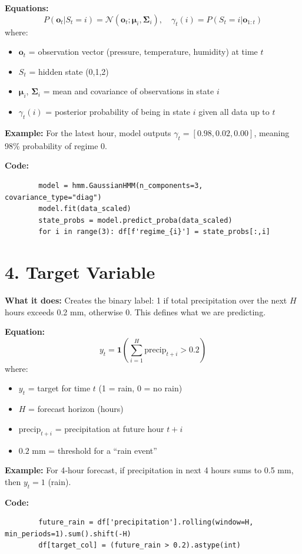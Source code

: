 \documentclass[12pt]{article}
\begin{document}
	\textbf{Equations:}
	\[
	P(\mathbf{o}_t|S_t=i)=\mathcal{N}(\mathbf{o}_t;\boldsymbol{\mu}_i,\boldsymbol{\Sigma}_i),\quad
	\gamma_t(i)=P(S_t=i|\mathbf{o}_{1:t})
	\]
	where:
	\begin{itemize}
		\item $\mathbf{o}_t$ = observation vector (pressure, temperature, humidity) at time $t$
		\item $S_t$ = hidden state (0,1,2)
		\item $\boldsymbol{\mu}_i$, $\boldsymbol{\Sigma}_i$ = mean and covariance of observations in state $i$
		\item $\gamma_t(i)$ = posterior probability of being in state $i$ given all data up to $t$
	\end{itemize}
	
	\textbf{Example:} For the latest hour, model outputs $\gamma_t = [0.98, 0.02, 0.00]$, meaning 98\% probability of regime 0.
	
	\textbf{Code:}
	\begin{lstlisting}
		model = hmm.GaussianHMM(n_components=3, covariance_type="diag")
		model.fit(data_scaled)
		state_probs = model.predict_proba(data_scaled)
		for i in range(3): df[f'regime_{i}'] = state_probs[:,i]
	\end{lstlisting}
	
	\section*{4. Target Variable}
	\textbf{What it does:} Creates the binary label: 1 if total precipitation over the next $H$ hours exceeds 0.2 mm, otherwise 0. This defines what we are predicting.
	
	\textbf{Equation:}
	\[
	y_t = \mathbf{1}\left(\sum_{i=1}^{H} \text{precip}_{t+i} > 0.2\right)
	\]
	where:
	\begin{itemize}
		\item $y_t$ = target for time $t$ (1 = rain, 0 = no rain)
		\item $H$ = forecast horizon (hours)
		\item $\text{precip}_{t+i}$ = precipitation at future hour $t+i$
		\item $0.2$ mm = threshold for a “rain event”
	\end{itemize}
	
	\textbf{Example:} For 4‑hour forecast, if precipitation in next 4 hours sums to 0.5 mm, then $y_t=1$ (rain).
	
	\textbf{Code:}
	\begin{lstlisting}
		future_rain = df['precipitation'].rolling(window=H, min_periods=1).sum().shift(-H)
		df[target_col] = (future_rain > 0.2).astype(int)
	\end{lstlisting}
	
\end{document}

